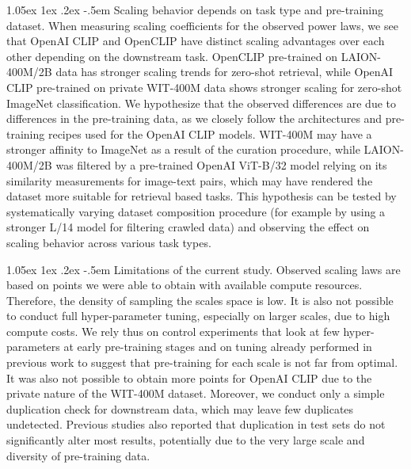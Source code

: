 \documentclass[11pt,table]{article}
\makeatletter
\newcommand{\citep}{\cite}
\renewcommand\paragraph{\@startsection{paragraph}{4}{\z@}                                     {1.05ex \@plus1ex \@minus.2ex}                                {-.5em}
{\normalfont\normalsize\bfseries}}
\makeatother
\begin{document}
\paragraph{Scaling behavior depends on task type and pre-training dataset.} 
When measuring scaling coefficients for the observed power laws, we see that OpenAI CLIP and OpenCLIP have distinct scaling advantages over each other depending on the downstream task. OpenCLIP pre-trained on LAION-400M/2B data has stronger scaling trends for zero-shot retrieval, while OpenAI CLIP pre-trained on private WIT-400M data shows stronger scaling for zero-shot ImageNet classification.  We hypothesize that the observed differences are due to differences in the pre-training data, as we closely follow the architectures and pre-training recipes used for the OpenAI CLIP models. WIT-400M may have a stronger affinity to ImageNet as a result of the curation procedure, while LAION-400M/2B was filtered by a pre-trained OpenAI ViT-B/32 model relying on its similarity measurements for image-text pairs, which may have rendered the dataset more suitable for retrieval based tasks. This hypothesis can be tested by systematically varying dataset composition procedure (for example by using a stronger L/14 model for filtering crawled data) and observing the effect on scaling behavior across various task types.





\paragraph{Limitations of the current study.} Observed scaling laws are based on points we were able to obtain with available compute resources. Therefore, the density of sampling the scales space is low. It is also not possible to conduct full hyper-parameter tuning, especially on larger scales, due to high compute costs. We rely thus on control experiments that look at few hyper-parameters at early pre-training stages and on tuning already performed in previous work to suggest that pre-training for each scale is not far from optimal. It was also not possible to obtain more points for OpenAI CLIP due to the private nature of the WIT-400M dataset. Moreover, we conduct only a simple duplication check for downstream data, which may leave few duplicates undetected. Previous studies \citep{radford2021learning, zhai2021lit} also reported that duplication in test sets do not significantly alter most results, potentially due to the very large scale and diversity of pre-training data. 
\end{document}

